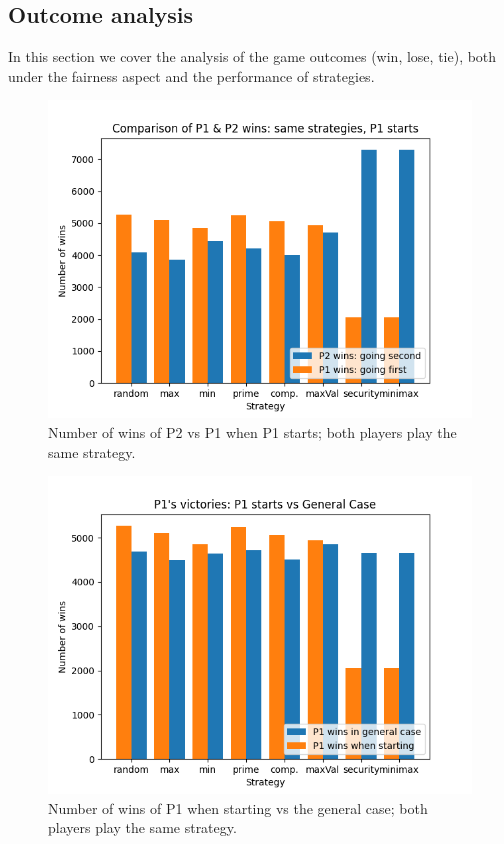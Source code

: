 \subsection{Outcome analysis}

In this section we cover the analysis of the game outcomes (win, lose, tie), both under the fairness aspect and the performance of strategies.

\begin{figure}
	\centering
	\includegraphics[width=1\linewidth]{img/histogram_p1vsp2_p1first.png}
	\caption{Number of wins of P2 vs P1 when P1 starts; both players play the same strategy.}
	\label{fig:hist_p1vsp2_p1first}
\end{figure}

\begin{figure}
	\centering
	\includegraphics[width=1\linewidth]{img/histogram_p1wins_2cases.png}
	\caption{Number of wins of P1 when starting vs the general case; both players play the same strategy.}
	\label{fig:hist_p1wins_2cases}
\end{figure}

